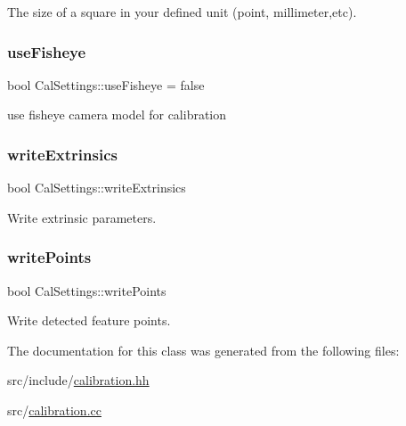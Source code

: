 The size of a square in your defined unit (point, millimeter,etc). 

\mbox{\label{class_cal_settings_a5bd22c0af6208eb2733625a23e209b94}} 
\subsubsection{\texorpdfstring{useFisheye}{useFisheye}}
{\footnotesize\ttfamily bool Cal\+Settings\+::use\+Fisheye = false}



use fisheye camera model for calibration 

\mbox{\label{class_cal_settings_a474530e6edf434e35e8b8727627e1fcb}} 
\subsubsection{\texorpdfstring{writeExtrinsics}{writeExtrinsics}}
{\footnotesize\ttfamily bool Cal\+Settings\+::write\+Extrinsics}



Write extrinsic parameters. 

\mbox{\label{class_cal_settings_ae02acb9427145d18a3c6a070b3cb16f9}} 
\subsubsection{\texorpdfstring{writePoints}{writePoints}}
{\footnotesize\ttfamily bool Cal\+Settings\+::write\+Points}



Write detected feature points. 



The documentation for this class was generated from the following files\+:\begin{DoxyCompactItemize}
\item 
src/include/\mbox{\hyperlink{calibration_8hh}{calibration.\+hh}}\item 
src/\mbox{\hyperlink{calibration_8cc}{calibration.\+cc}}\end{DoxyCompactItemize}
